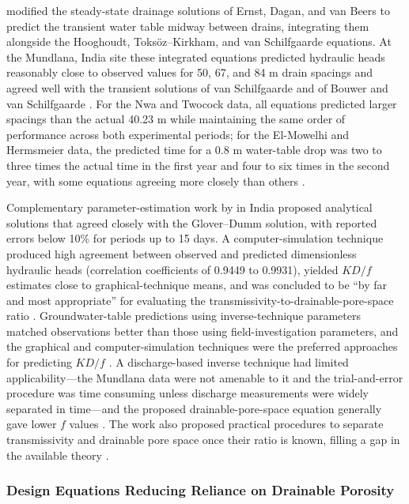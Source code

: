 \documentclass[11pt]{article}
\begin{document}
\textcite{SINGH1992} modified the steady-state drainage solutions of Ernst, Dagan, and van
Beers to predict the transient water table midway between drains, integrating them
alongside the Hooghoudt, Toksöz--Kirkham, and van Schilfgaarde equations. At the Mundlana,
India site these integrated equations predicted hydraulic heads reasonably close to
observed values for 50, 67, and 84 m drain spacings and agreed well with the transient
solutions of van Schilfgaarde and of Bouwer and van Schilfgaarde \parencite{SINGH1992}.
For the Nwa and Twocock data, all equations predicted larger spacings than the actual
40.23 m while maintaining the same order of performance across both experimental periods;
for the El-Mowelhi and Hermsmeier data, the predicted time for a 0.8 m water-table drop
was two to three times the actual time in the first year and four to six times in the
second year, with some equations agreeing more closely than others
\parencite{SINGH1992}.

Complementary parameter-estimation work by \textcite{KUMAR1994} in India proposed
analytical solutions that agreed closely with the Glover--Dumm solution, with reported
errors below 10\% for periods up to 15 days. A computer-simulation technique produced high
agreement between observed and predicted dimensionless hydraulic heads (correlation
coefficients of 0.9449 to 0.9931), yielded $KD/f$ estimates close to graphical-technique
means, and was concluded to be ``by far and most appropriate'' for evaluating the
transmissivity-to-drainable-pore-space ratio \parencite{KUMAR1994}. Groundwater-table
predictions using inverse-technique parameters matched observations better than those
using field-investigation parameters, and the graphical and computer-simulation techniques
were the preferred approaches for predicting $KD/f$ \parencite{KUMAR1994}. A
discharge-based inverse technique had limited applicability---the Mundlana data were not
amenable to it and the trial-and-error procedure was time consuming unless discharge
measurements were widely separated in time---and the proposed drainable-pore-space
equation generally gave lower $f$ values \parencite{KUMAR1994}. The work also proposed
practical procedures to separate transmissivity and drainable pore space once their ratio
is known, filling a gap in the available theory \parencite{KUMAR1994}.

\subsubsection{Design Equations Reducing Reliance on Drainable Porosity}
\end{document}
